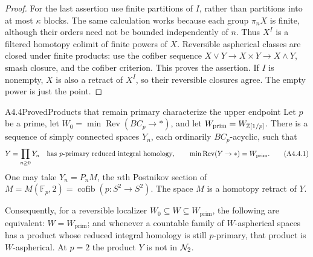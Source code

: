 \begin{proof}
For the last assertion use finite partitions of $I$, rather than
partitions into at most $\kappa$ blocks.  The same calculation works
because each group $\pi_nX$ is finite, although their orders need not
be bounded independently of $n$.  Thus $X^I$ is a filtered homotopy
colimit of finite powers of $X$.  Reversible aspherical classes are
closed under finite products: use the cofiber sequence
$X\vee Y\to X\times Y\to X\wedge Y$, smash closure, and the
cofiber criterion.  This proves the assertion.  If $I$ is nonempty,
$X$ is also a retract of $X^I$, so their reversible closures agree.
The empty power is just the point.
\end{proof}

\begin{claim}{A4.4}{Proved}{Products that remain primary characterize the upper endpoint}\label{A44}
Let $p$ be a prime, let
$W_0=\min\operatorname{Rev}(BC_p\to *)$, and let
$W_{\mathrm{prim}}=W_{\mathbb Z[1/p]}$.
There is a sequence of simply connected spaces $Y_n$, each ordinarily
$BC_p$-acyclic, such that
\[
 Y=\prod_{n\geq0}Y_n
 \quad\hbox{has $p$-primary reduced integral homology},\qquad
 \min\operatorname{Rev}(Y\to *)=W_{\mathrm{prim}}.
 \tag{A4.4.1}
\]
One may take $Y_n=P_nM$, the $n$th Postnikov section of
$M=M(\mathbb F_p,2)=\operatorname{cofib}(p:S^2\to S^2)$.
The space $M$ is a homotopy retract of $Y$.

Consequently, for a reversible localizer
$W_0\subseteq W\subseteq W_{\mathrm{prim}}$, the following are
equivalent: $W=W_{\mathrm{prim}}$; and whenever a countable family of
$W$-aspherical spaces has a product whose reduced integral homology
is still $p$-primary, that product is $W$-aspherical.
At $p=2$ the product $Y$ is not in $\mathcal N_2$.
\end{claim}
